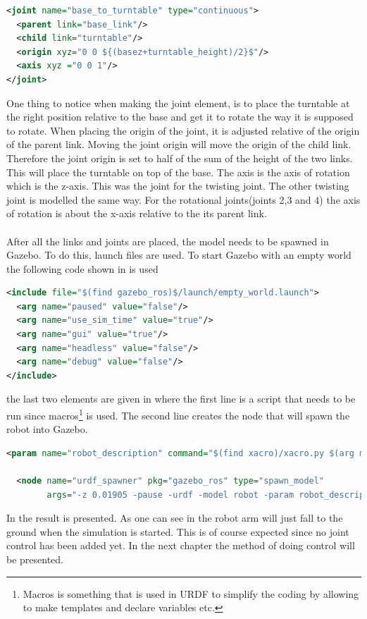 \begin{lstlisting}[language=xml,caption={joint between base and turntable},label={lst:jointBTT}]
<joint name="base_to_turntable" type="continuous">
  <parent link="base_link"/>
  <child link="turntable"/>
  <origin xyz="0 0 ${(basez+turntable_height)/2}$"/>
  <axis xyz ="0 0 1"/>
</joint>
\end{lstlisting}
One thing to notice when making the joint element, is to place the turntable at the right position relative to the base and get it to rotate the way it is supposed to rotate. When placing the origin of the joint, it is adjusted relative of the origin of the parent link. Moving the joint origin will move the origin of the child link. Therefore the joint origin is set to half of the sum of the height of the two links. This will place the turntable on top of the base. The axis is the axis of rotation which is the z-axis. This was the joint for the twisting joint. The other twisting joint is modelled the same way. For the rotational joints(joints 2,3 and 4) the axis of rotation is about the x-axis relative to the its parent link. \\\\
After all the links and joints are placed, the model needs to be spawned in Gazebo. To do this, launch files are used. To start Gazebo with an empty world the following code shown in  is used
\begin{lstlisting}[language=xml,caption={Start Gazebo with empty world},label={lst:empty}]
<include file="$(find gazebo_ros)$/launch/empty_world.launch">
  <arg name="paused" value="false"/>
  <arg name="use_sim_time" value="true"/>
  <arg name="gui" value="true"/>
  <arg name="headless" value="false"/>
  <arg name="debug" value="false"/>
</include>
\end{lstlisting}
the last two elements are given in  where the first line is a script that needs to be run since macros\footnote{Macros is something that is used in URDF to simplify the coding by allowing to make templates and declare variables etc.} is used. The second line creates the node that will spawn the robot into Gazebo. 
\begin{lstlisting}[caption={Spawn robot model in Gazebo},label={lst:l2},language=xml]
  <param name="robot_description" command="$(find xacro)/xacro.py $(arg model)" />

  <node name="urdf_spawner" pkg="gazebo_ros" type="spawn_model"
        args="-z 0.01905 -pause -urdf -model robot -param robot_description" respawn="false" output="screen" />
\end{lstlisting}
In  the result is presented. As one can see in  the robot arm will just fall to the ground when the simulation is started. This is of course expected since no joint control has been added yet. In the next chapter the method of doing control will be presented. 

